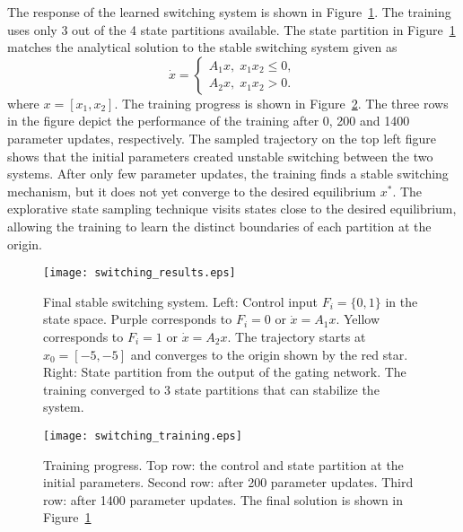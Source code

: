 %
The response of the learned switching system is shown in
Figure~\ref{fig:final_switching}.
%
The training uses only 3 out of the 4 state partitions available.
%
The state partition in Figure~\ref{fig:final_switching} matches the analytical
solution to the stable switching system given as~\cite{liberzon2003switching}
\begin{equation*}
    \dot{x} = \begin{cases}
        A_1x, \; x_1x_2 \leq 0, \\
        A_2x, \; x_1x_2 > 0.
    \end{cases}
\end{equation*}
\noindent where $x=[x_1, x_2]$.
%
The training progress is shown in Figure~\ref{fig:switching_training}.
%
The three rows in the figure depict the performance of the training after 0, 200
and 1400 parameter updates, respectively.
%
The sampled trajectory on the top left figure shows that the initial parameters
created unstable switching between the two systems.
%
After only few parameter updates, the training finds a stable switching
mechanism, but it does not yet converge to the desired equilibrium $x^*$.
%
The explorative state sampling technique visits states close to the desired
equilibrium, allowing the training to learn the distinct boundaries of each
partition at the origin. 
\begin{figure}[H]
    \centering
    \texttt{[image: switching\_results.eps]}
    \caption{Final stable switching system. Left: Control input $F_i=\{0, 1\}$ in
    the state space. Purple corresponds to $F_i=0$ or $\dot{x} = A_1x$. Yellow
    corresponds to $F_i=1$ or $\dot{x} = A_2x$. The trajectory starts at $x_0=[-5,
    -5]$ and converges to the origin shown by the red star. Right: State
    partition from the output of the gating network. The training converged to 3
    state partitions that can stabilize the system.}
    \label{fig:final_switching}
\end{figure}

\begin{figure}[H]
    \centering
    \texttt{[image: switching\_training.eps]}
    \caption{Training progress. Top row: the control and state partition at the
    initial parameters. Second row: after 200 parameter updates. Third row:
    after 1400 parameter updates. The final solution is shown in
    Figure~\ref{fig:final_switching}}
    \label{fig:switching_training}
\end{figure} 
